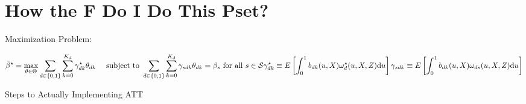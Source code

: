 \documentclass[
]{article}
\author{}
\date{}
\begin{document}
\hypertarget{header-n36}{%
\section{How the F Do I Do This Pset?}\label{header-n36}}

Maximization Problem:

\[\bar{\beta}^{\star}=\max _{\theta \in \Theta} \sum_{d \in\{0,1\}} \sum_{k=0}^{K_{d}} \gamma_{d k}^{\star} \theta_{d k} \quad \text { subject to } \sum_{d \in\{0,1\}} \sum_{k=0}^{K_{d}} \gamma_{s d k} \theta_{d k}=\beta_{s} \text { for all } s \in \mathcal{S} \\
\gamma_{d k}^{\star} \equiv E\left[\int_{0}^{1} b_{d k}(u, X) \omega_{d}^{\star}(u, X, Z) \mathrm{d} u\right] \\
\gamma_{s d k} \equiv E\left[\int_{0}^{1} b_{d k}(u, X) \omega_{d s}(u, X, Z) \mathrm{d} u\right]\]

Steps to Actually Implementing ATT
\end{document}
